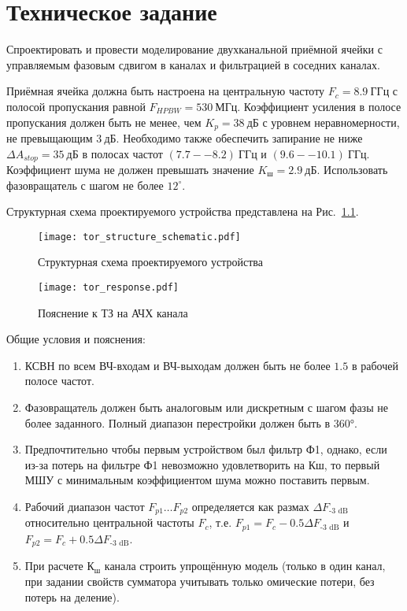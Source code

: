 \chapter{Техническое задание}

Спроектировать и провести моделирование двухканальной приёмной ячейки с управляемым фазовым сдвигом в каналах и фильтрацией в соседних каналах.

Приёмная ячейка должна быть настроена на центральную частоту $F_c = 8.9~\text{ГГц}$ с полосой пропускания равной $F_{HPBW} = 530~\text{МГц}$.
Коэффициент усиления в полосе пропускания должен быть не менее, чем $K_p = 38~\text{дБ}$ с уровнем неравномерности, не превыщающим $3~\text{дБ}$.
Необходимо также обеспечить запирание не ниже $\Delta A_{stop} = 35~\text{дБ}$ в полосах частот $(7.7--8.2)~\text{ГГц}$ и $(9.6--10.1)~\text{ГГц}$.
Коэффициент шума не должен превышать значение $K_{ш} = 2.9~\text{дБ}$.
Использовать фазовращатель с шагом не более $12^\circ$.

Структурная схема проектируемого устройства представлена на Рис.~\ref{fig:tor_structure_schematic}.

\begin{figure}[!ht]
    \centering
    \texttt{[image: tor\_structure\_schematic.pdf]}
    \caption{Структурная схема проектируемого устройства}%
    \label{fig:tor_structure_schematic}
\end{figure}

\begin{figure}[!ht]
    \centering
    \texttt{[image: tor\_response.pdf]}
    \caption{Пояснение к ТЗ на АЧХ канала}%
    \label{fig:tor_response}
\end{figure}

Общие условия и пояснения:
\begin{enumerate}
    \item
        КСВН по всем ВЧ-входам и ВЧ-выходам должен быть не более $1.5$ в рабочей полосе частот.
    \item
        Фазовращатель должен быть аналоговым или дискретным с шагом фазы не более заданного.
        Полный диапазон перестройки должен быть в 360°.
    \item
        Предпочтительно чтобы первым устройством был фильтр Ф1, однако, если из-за потерь на фильтре Ф1 невозможно удовлетворить на Кш, то первый МШУ с минимальным коэффициентом шума можно поставить первым.
    \item
        Рабочий диапазон частот $F_{p1} \ldots F_{p2}$ определяется как размах $\Delta F_\text{-3~dB}$ относительно центральной частоты $F_c$, т.е. $F_{p1} = F_c - 0.5 \Delta F_\text{-3~dB}$ и $F_{p2} = F_c + 0.5 \Delta F_\text{-3~dB}$.
    \item
        При расчете $К_\text{ш}$ канала строить упрощённую модель (только в один канал, при задании свойств сумматора учитывать только омические потери, без потерь на деление).
\end{enumerate}
